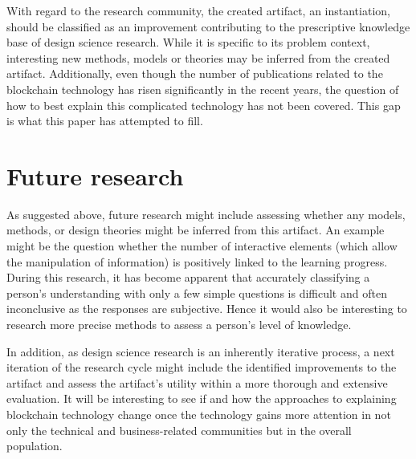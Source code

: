 With regard to the research community, the created artifact, an instantiation, should be classified as an improvement contributing to the prescriptive knowledge base of design science research. While it is specific to its problem context, interesting new methods, models or theories may be inferred from the created artifact. Additionally, even though the number of publications related to the blockchain technology has risen significantly in the recent years, the question of how to best explain this complicated technology has not been covered. This gap is what this paper has attempted to fill.

\section{Future research} \label{sec:FutureResearch}
As suggested above, future research might include assessing whether any models, methods, or design theories might be inferred from this artifact. An example might be the question whether the number of interactive elements (which allow the manipulation of information) is positively linked to the learning progress. During this research, it has become apparent that accurately classifying a person's understanding with only a few simple questions is difficult and often inconclusive as the responses are subjective. Hence it would also be interesting to research more precise methods to assess a person's level of knowledge.

In addition, as design science research is an inherently iterative process, a next iteration of the research cycle might include the identified improvements to the artifact and assess the artifact's utility within a more thorough and extensive evaluation. It will be interesting to see if and how the approaches to explaining blockchain technology change once the technology gains more attention in not only the technical and business-related communities but in the overall population.